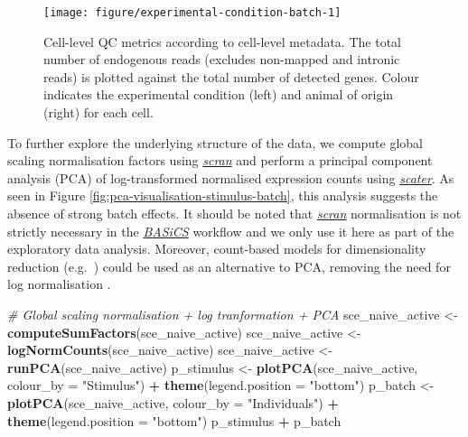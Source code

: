 \documentclass[9pt,a4paper,]{extarticle}
\newenvironment{Shaded}{\begin{snugshade}}{\end{snugshade}}
\newcommand{\CommentTok}[1]{\textcolor[rgb]{0.56,0.35,0.01}{\textit{#1}}}
\newcommand{\DataTypeTok}[1]{\textcolor[rgb]{0.13,0.29,0.53}{#1}}
\newcommand{\KeywordTok}[1]{\textcolor[rgb]{0.13,0.29,0.53}{\textbf{#1}}}
\newcommand{\NormalTok}[1]{#1}
\newcommand{\OperatorTok}[1]{\textcolor[rgb]{0.81,0.36,0.00}{\textbf{#1}}}
\newcommand{\StringTok}[1]{\textcolor[rgb]{0.31,0.60,0.02}{#1}}
\begin{document}
\begin{figure}

{\centering \texttt{[image: figure/experimental-condition-batch-1]} 

}

\caption{Cell-level QC metrics according to cell-level metadata. The total number of endogenous reads (excludes non-mapped and intronic reads) is plotted against the total number of detected genes. Colour indicates the experimental condition (left) and animal of origin (right) for each cell.}\label{fig:experimental-condition-batch}
\end{figure}

To further explore the underlying structure of the data, we compute global
scaling normalisation factors using \emph{\href{https://bioconductor.org/packages/3.11/scran}{scran}} and perform a
principal component analysis (PCA) of log-transformed normalised expression
counts using \emph{\href{https://bioconductor.org/packages/3.11/scater}{scater}}.
As seen in Figure \ref{fig:pca-visualisation-stimulus-batch}, this analysis
suggests the absence of strong batch effects.
It should be noted that \emph{\href{https://bioconductor.org/packages/3.11/scran}{scran}} normalisation
is not strictly necessary in the \emph{\href{https://bioconductor.org/packages/3.11/BASiCS}{BASiCS}} workflow and we only
use it here as part of the exploratory data analysis.
Moreover, count-based models for dimensionality reduction (e.g.~\citep{Townes2019, Lopez2018}) could be used as an alternative to PCA,
removing the need for log normalisation .

\begin{Shaded}
\begin{Highlighting}[]
\CommentTok{# Global scaling normalisation + log tranformation + PCA}
\NormalTok{sce_naive_active <-}\StringTok{ }\KeywordTok{computeSumFactors}\NormalTok{(sce_naive_active)}
\NormalTok{sce_naive_active <-}\StringTok{ }\KeywordTok{logNormCounts}\NormalTok{(sce_naive_active)}
\NormalTok{sce_naive_active <-}\StringTok{ }\KeywordTok{runPCA}\NormalTok{(sce_naive_active)}
\NormalTok{p_stimulus <-}\StringTok{ }\KeywordTok{plotPCA}\NormalTok{(sce_naive_active, }\DataTypeTok{colour_by =} \StringTok{"Stimulus"}\NormalTok{) }\OperatorTok{+}
\StringTok{  }\KeywordTok{theme}\NormalTok{(}\DataTypeTok{legend.position =} \StringTok{"bottom"}\NormalTok{)}
\NormalTok{p_batch <-}\StringTok{ }\KeywordTok{plotPCA}\NormalTok{(sce_naive_active, }\DataTypeTok{colour_by =} \StringTok{"Individuals"}\NormalTok{) }\OperatorTok{+}
\StringTok{  }\KeywordTok{theme}\NormalTok{(}\DataTypeTok{legend.position =} \StringTok{"bottom"}\NormalTok{)}
\NormalTok{p_stimulus }\OperatorTok{+}\StringTok{ }\NormalTok{p_batch}
\end{Highlighting}
\end{Shaded}
\end{document}
